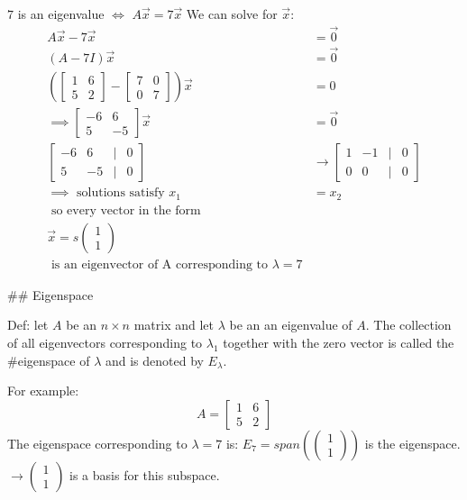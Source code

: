 $7$ is an eigenvalue $\Leftrightarrow$ $A\vec{x}=7\vec{x}$
We can solve for $\vec{x}$:
$$
\begin{align}
A\vec{x}-7\vec{x}&=\vec{0} \\
(A-7I)\vec{x}&=\vec{0}  \\
\left( \begin{bmatrix}
1 & 6\\5 & 2
\end{bmatrix} - \begin{bmatrix}
7 & 0\\0 & 7
\end{bmatrix} \right) \vec{x} &= 0 \\
\implies \begin{bmatrix}
-6 & 6\\5 & -5
\end{bmatrix}\vec{x}&=\vec{0} \\
\begin{bmatrix}
-6 & 6 & | & 0 \\
5 & -5 & | & 0
\end{bmatrix} &\to   \begin{bmatrix}
1 & -1 & | & 0 \\
0 & 0 & | & 0
\end{bmatrix} \\
\implies \text{ solutions satisfy }x_{1}&=x_{2} \\
 \text{ so every vector in the form } &\\
\vec{x}=s\begin{pmatrix}
1\\1
\end{pmatrix}\\\text{ is an eigenvector of A corresponding to }\lambda= 7
\end{align}
$$

## Eigenspace

Def: let $A$ be an $n\times n$ matrix and let $\lambda$ be an an eigenvalue of $A$. The collection of all eigenvectors corresponding to $\lambda_{1}$ together with the zero vector is called the #eigenspace of $\lambda$ and is denoted by $E_{\lambda}$.

For example: 
$$
A = \begin{bmatrix}
1 & 6 \\
5 & 2
\end{bmatrix}
$$
The eigenspace corresponding to $\lambda=7$ is:
$E_{7}=s pan(\begin{pmatrix}1 \\ 1\end{pmatrix})$ is the eigenspace.
$\to \begin{pmatrix}1 \\ 1\end{pmatrix}$ is a basis for this subspace. 

